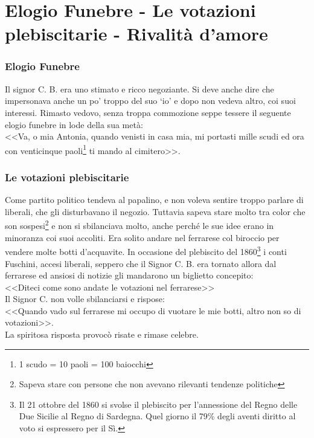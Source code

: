 
\chapter{Elogio Funebre - Le votazioni plebiscitarie - Rivalità d'amore}
\subsection{Elogio Funebre}
Il signor C. B. era uno stimato e ricco negoziante. Si deve anche dire che impersonava anche un po' troppo del suo ‘io' e dopo non vedeva altro, coi suoi interessi. Rimasto vedovo, senza troppa commozione seppe tessere il seguente elogio funebre in lode della sua metà:\\
\indent <<Va, o mia Antonia, quando venisti in casa mia, mi portasti mille scudi ed ora con venticinque paoli\footnote{1 scudo = 10 paoli = 100 baiocchi} ti mando al cimitero>>.\\

\subsection{Le votazioni plebiscitarie}
Come partito politico tendeva al papalino, e non voleva sentire troppo parlare di liberali, che gli disturbavano il negozio. Tuttavia sapeva stare molto tra color che son sospesi\footnote{Sapeva stare con persone che non avevano rilevanti tendenze politiche} e non si sbilanciava molto, anche perché le sue idee erano in minoranza coi suoi accoliti. Era solito andare nel ferrarese col biroccio per vendere molte botti d'acquavite. In occasione del plebiscito del 1860\footnote{Il 21 ottobre del 1860 si svolse il plebiscito per l'annessione del Regno delle Due Sicilie al Regno di Sardegna. Quel giorno il 79\% degli aventi diritto al voto si espressero per il Sì.} i conti Fuschini, accesi liberali, seppero che il Signor C. B. era tornato allora dal ferrarese ed ansiosi di notizie gli mandarono un biglietto concepito:\\
\indent <<Diteci come sono andate le votazioni nel ferrarese>>\\
\indent Il Signor C. non volle sbilanciarsi e rispose:\\
\indent<<Quando vado sul ferrarese mi occupo di vuotare le mie botti, altro non so di votazioni>>.\\
La spiritosa risposta provocò risate e rimase celebre. \\
